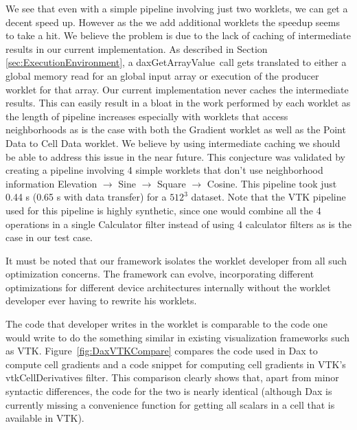 \documentclass{vgtc}                          %
\begin{document}
We see that even with a simple pipeline involving just two worklets, we can
get a decent speed up. However as the we add additional worklets the speedup
seems to take a hit. We believe the problem is due to the lack of caching of
intermediate results in our current implementation. As described in Section
\ref{sec:ExecutionEnvironment}, a daxGetArrayValue\textasteriskcentered~call
gets translated to either a global memory read for an global input array or
execution of the producer worklet for that array. Our current implementation
never caches the intermediate results. This can easily result in a bloat in the
work performed by each worklet as the length of pipeline increases especially
with worklets that access neighborhoods as is the case with both the Gradient
worklet as well as the Point Data to Cell Data worklet. We believe by using
intermediate caching we should be able to address this issue in the near future.
This conjecture was validated by creating a pipeline involving 4 simple
worklets that don't use neighborhood information Elevation $\rightarrow$ Sine
$\rightarrow$ Square $\rightarrow$ Cosine. This pipeline took just 0.44 s (0.65
s with data transfer) for a $512^3$ dataset. Note that the VTK pipeline used for
this pipeline is highly synthetic, since one would combine all the 4 operations
in a single Calculator filter instead of using 4 calculator filters as is the
case in our test case.

It must be noted that our framework isolates the worklet developer from
all such optimization concerns. The framework can evolve, incorporating
different optimizations for different device architectures internally without
the worklet developer ever having to rewrite his worklets.

The code that developer writes in the worklet is comparable to the code
one would write to do the something similar in existing visualization frameworks
such as VTK. Figure~\ref{fig:DaxVTKCompare} compares the code used in Dax
to compute cell gradients and a code snippet for computing cell gradients
in VTK's vtkCellDerivatives filter.  This comparison clearly shows that,
apart from minor syntactic differences, the code for the two is nearly
identical (although Dax is currently missing a convenience function for
getting all scalars in a cell that is available in VTK).
\end{document}
